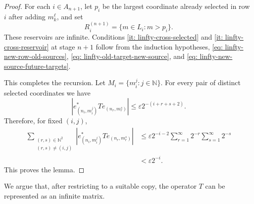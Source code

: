 \documentclass[11pt]{amsart}
\theoremstyle{plain}
\theoremstyle{definition}
\numberwithin{equation}{section}
\newcommand{\N}{\mathbb{N}}
\renewcommand{\leq}{\leqslant}
\begin{document}
\begin{proof}
    For each $i\in A_{n+1}$, let $p_i$ be the largest coordinate already selected in row $i$ after adding $m_k^\ell$, and set
    \begin{equation*}
        R_i^{(n+1)}=\{m\in L_i:m>p_i\}.
    \end{equation*}
    These reservoirs are infinite. Conditions \ref{it: linfty-cross-selected} and \ref{it: linfty-cross-reservoir} at stage $n+1$ follow from the induction hypotheses, \eqref{eq: linfty-new-row-old-sources}, \eqref{eq: linfty-old-target-new-source}, and \eqref{eq: linfty-new-source-future-targets}.

    This completes the recursion. Let $M_i=\{m_i^j:j\in\N\}$. For every pair of distinct selected coordinates we have
    \begin{equation*}
        |e^*_{(n_i,m_i^j)}Te_{(n_r,m_r^s)}|\leq \varepsilon2^{-(i+r+s+2)}.
    \end{equation*}
    Therefore, for fixed $(i,j)$,
    \begin{align*}
        \sum_{\substack{(r,s)\in\N^2 \\ (r,s)\ne(i,j)}} |e^*_{(n_i,m_i^j)}Te_{(n_r,m_r^s)}|
        &\leq \varepsilon2^{-i-2}\sum_{r=1}^\infty2^{-r}\sum_{s=1}^\infty2^{-s} \\
        &<\varepsilon2^{-i}.
    \end{align*}
    This proves the lemma.
\end{proof}

We argue that, after restricting to a suitable copy, the operator $T$ can be represented as an infinite matrix.
\end{document}

